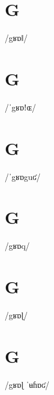 \documentclass[10pt,a4paper,twoside]{book}
\begin{document}
\section*{G}

\begin{multicols}{3}
 {/gʁɒǁ/} {}
\end{multicols}

\section*{G}

\begin{multicols}{3}
 {/ˈgʁɒǃɶ/} {}
\end{multicols}

\section*{G}

\begin{multicols}{3}
 {/ˈgʁɒguʛ/} {}
\end{multicols}

\section*{G}

\begin{multicols}{3}
 {/gʁɒq/} {}
\end{multicols}

\section*{G}

\begin{multicols}{3}
 {/gʁɒɭ/} {}
\end{multicols}

\section*{G}

\begin{multicols}{3}
 {/gʁɒɭ ˈʉɦɒʛ/} {}
\end{multicols}
\end{document}

